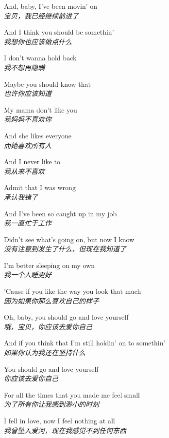 \begin{spacing}{1.5}
\begin{flushleft}
And, baby, I've been movin' on\\
\textit{宝贝，我已经继续前进了}\lyricspace

And I think you should be somethin'\\
\textit{我想你也应该做点什么}\lyricspace

I don't wanna hold back\\
\textit{我不想再隐瞒}\lyricspace

Maybe you should know that\\
\textit{也许你应该知道}\lyricspace

My mama don't like you\\
\textit{我妈妈不喜欢你}\lyricspace

And she likes everyone\\
\textit{而她喜欢所有人}\lyricspace

And I never like to\\
\textit{我从来不喜欢}\lyricspace

Admit that I was wrong\\
\textit{承认我错了}\lyricspace

And I've been so caught up in my job\\
\textit{我一直忙于工作}\lyricspace

Didn't see what's going on, but now I know\\
\textit{没有注意到发生了什么，但现在我知道了}\lyricspace

I'm better sleeping on my own\\
\textit{我一个人睡更好}\lyricspace

'Cause if you like the way you look that much\\
\textit{因为如果你那么喜欢自己的样子}\lyricspace

Oh, baby, you should go and love yourself\\
\textit{哦，宝贝，你应该去爱你自己}\lyricspace

And if you think that I'm still holdin' on to somethin'\\
\textit{如果你认为我还在坚持什么}\lyricspace

You should go and love yourself\\
\textit{你应该去爱你自己}\lyricspace

For all the times that you made me feel small\\
\textit{为了所有你让我感到渺小的时刻}\lyricspace

I fell in love, now I feel nothing at all\\
\textit{我曾坠入爱河，现在我感觉不到任何东西}\lyricspace


\end{flushleft}
\end{spacing}
